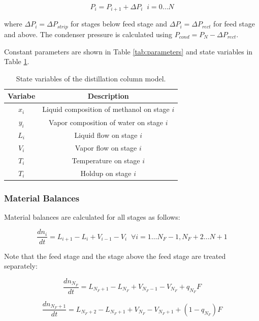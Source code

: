 \begin{equation}
    P_i = P_{i+1} + \Delta P_i \;\; i=0\dots N
\end{equation}

where $\Delta P_i =\Delta P_{strip}$ for stages below feed stage and $\Delta P_i =\Delta P_{rect}$ for feed stage and above. The condenser pressure is calculated using $P_{cond}=P_{N} - \Delta P_{rect}$.

Constant parameters are shown in Table \ref{tab:parameters} and state variables in Table \ref{tab:state_variables}.
\begin{table}
    \centering
    \caption{State variables of the distillation column model.}
    \begin{tabular}{cc}
        \textbf{Variabe} & \textbf{Description}  \\
        \hline
         $x_i$ &  Liquid composition of methanol on stage $i$ \\
         $y_i$ & Vapor composition of water on stage $i$\\
         $L_i$ & Liquid flow on stage $i$  \\
         $V_i$  & Vapor flow on stage $i$ \\
         $T_i$  & Temperature on stage $i$ \\
         $T_i$  & Holdup on stage $i$ \\
         \hline
    \end{tabular}
    
    \label{tab:state_variables}
\end{table}

\subsubsection{Material Balances}
Material balances are calculated for all stages as follows:

\begin{equation}
\frac{dn_i}{dt} = L_{i+1}-L_i + V_{i-1}-V_i \;\; \forall i=1 \dots N_F-1, N_F+2 \dots N+1
\end{equation}

Note that the feed stage and the stage above the feed stage are treated separately:

\begin{equation}
    \frac{dn_{N_F}}{dt} = L_{N_F+1}-L_{N_F} + V_{N_F-1}-V_{N_F} + q_{N_F}F   
\end{equation}

\begin{equation}
   \frac{dn_{N_F+1}}{dt} = L_{N_F+2}-L_{N_F+1} + V_{N_F}-V_{N_F+1} + (1-q_{N_F})F 
\end{equation}

